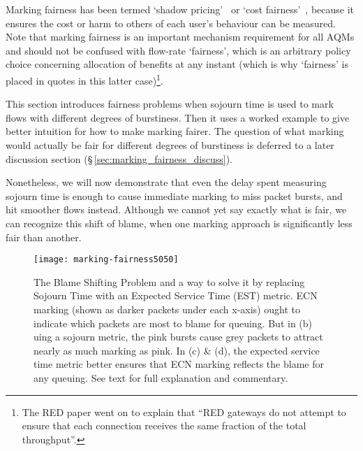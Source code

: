 Marking fairness has been termed `shadow pricing'~\cite{Kelly98:Shadow_prices_prop_fair} or `cost fairness'~\cite{Briscoe06g:Rate_fair_Dis}, because it ensures the cost or harm to others of each user's behaviour can be measured. Note that marking fairness is an important mechanism requirement for all AQMs and should not be confused with flow-rate `fairness', which is an arbitrary policy choice concerning allocation of benefits at any instant (which is why `fairness' is placed in quotes in this latter case)\footnote{The RED paper went on to explain that ``RED gateways do not attempt to ensure that each connection receives the same fraction of the total throughput''.}. 

This section introduces fairness problems when sojourn time is used to mark flows with different degrees of burstiness. Then it uses a worked example to give better intuition for how to make marking fairer. The question of what marking would actually be fair for different degrees of burstiness is deferred to a later discussion section (\S\,\ref{sec:marking_fairness_discuss}). 

Nonetheless, we will now demonstrate that even the delay spent measuring sojourn time is enough to cause immediate marking to miss packet bursts, and hit smoother flows instead. Although we cannot yet say exactly what is fair, we can recognize this shift of blame, when one marking approach is significantly less fair than another.

\begin{figure}[h]
	\centering
	\texttt{[image: marking-fairness5050]}
	\caption{The Blame Shifting Problem and a way to solve it by replacing Sojourn Time with an Expected Service Time (EST) metric. %
	ECN marking (shown as darker packets under each x-axis) ought to indicate which packets are most to blame for queuing. But in (b) uing a sojourn metric, the pink bursts cause grey packets to attract nearly as much marking as pink. In (c) \& (d), the expected service time metric better ensures that ECN marking reflects the blame for any queuing. See text for full explanation and commentary.}\label{fig:marking-fairness5050}
\end{figure}

